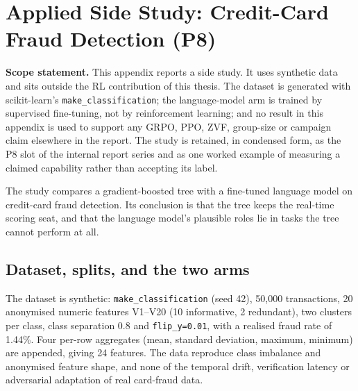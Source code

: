 \documentclass[12pt,a4paper]{report}
\begin{document}
\chapter{Applied Side Study: Credit-Card Fraud Detection
(P8)}\label{applied-side-study-credit-card-fraud-detection-p8}

\textbf{Scope statement.} This appendix reports a side study. It uses
synthetic data and sits outside the RL contribution of this thesis. The
dataset is generated with scikit-learn's \texttt{make\_classification};
the language-model arm is trained by supervised fine-tuning, not by
reinforcement learning; and no result in this appendix is used to
support any GRPO, PPO, ZVF, group-size or campaign claim elsewhere in
the report. The study is retained, in condensed form, as the P8 slot of
the internal report series and as one worked example of measuring a
claimed capability rather than accepting its label.

The study compares a gradient-boosted tree with a fine-tuned language
model on credit-card fraud detection. Its conclusion is that the tree
keeps the real-time scoring seat, and that the language model's
plausible roles lie in tasks the tree cannot perform at all.

\section{Dataset, splits, and the two
arms}\label{dataset-splits-and-the-two-arms}

The dataset is synthetic: \texttt{make\_classification} (seed 42),
50,000 transactions, 20 anonymised numeric features V1--V20 (10
informative, 2 redundant), two clusters per class, class separation 0.8
and \texttt{flip\_y=0.01}, with a realised fraud rate of 1.44\%. Four
per-row aggregates (mean, standard deviation, maximum, minimum) are
appended, giving 24 features. The data reproduce class imbalance and
anonymised feature shape, and none of the temporal drift, verification
latency or adversarial adaptation of real card-fraud data.
\end{document}

